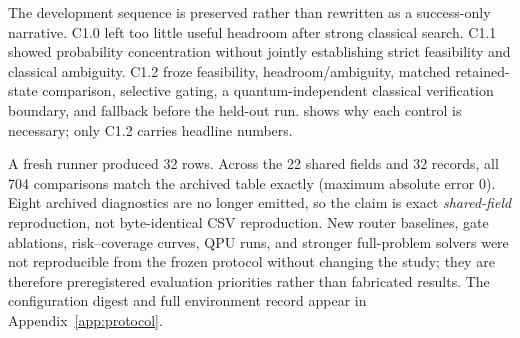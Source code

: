 The development sequence is preserved rather than rewritten as a success-only narrative. C1.0 left too little useful headroom after strong classical search. C1.1 showed probability concentration without jointly establishing strict feasibility and classical ambiguity. C1.2 froze feasibility, headroom/ambiguity, matched retained-state comparison, selective gating, a quantum-independent classical verification boundary, and fallback before the held-out run.  shows why each control is necessary; only C1.2 carries headline numbers.



A fresh runner produced 32 rows. Across the 22 shared fields and 32 records, all 704 comparisons match the archived table exactly (maximum absolute error 0). Eight archived diagnostics are no longer emitted, so the claim is exact \emph{shared-field} reproduction, not byte-identical CSV reproduction. New router baselines, gate ablations, risk--coverage curves, QPU runs, and stronger full-problem solvers were not reproducible from the frozen protocol without changing the study; they are therefore preregistered evaluation priorities rather than fabricated results. The configuration digest and full environment record appear in Appendix~\ref{app:protocol}.
